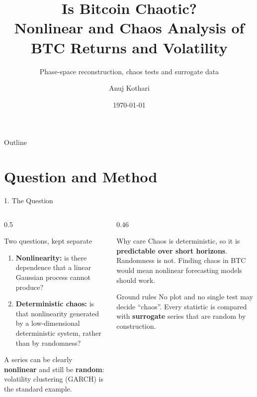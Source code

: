 \documentclass[aspectratio=169,10pt]{beamer}
\title[\textbf{Nonlinear Analysis of BTC}]{\Large \textbf{Is Bitcoin Chaotic?}\\\large Nonlinear and Chaos Analysis of BTC Returns and Volatility}
\subtitle{Phase-space reconstruction, chaos tests and surrogate data}
\author[\textbf{Anuj Kothari}]{Anuj Kothari}
\date{\today}
\begin{document}
\begin{frame}
    \titlepage
\end{frame}

\begin{frame}{Outline}
    \tableofcontents
\end{frame}

\section{Question and Method}

\begin{frame}{1. The Question}
    \begin{columns}[T]
        \begin{column}{0.5\textwidth}
            \begin{block}{Two questions, kept separate}
                \small
                \begin{enumerate}
                    \item \textbf{Nonlinearity:} is there dependence that a linear Gaussian process cannot produce?
                    \item \textbf{Deterministic chaos:} is that nonlinearity generated by a low-dimensional deterministic system, rather than by randomness?
                \end{enumerate}
            \end{block}
            \small
            A series can be clearly \textbf{nonlinear} and still be \textbf{random}: volatility clustering (GARCH) is the standard example.
        \end{column}
        \begin{column}{0.46\textwidth}
            \begin{alertblock}{Why care}
                \small
                Chaos is deterministic, so it is \textbf{predictable over short horizons}. Randomness is not.
                Finding chaos in BTC would mean nonlinear forecasting models should work.
            \end{alertblock}
            \begin{block}{Ground rules}
                \small
                No plot and no single test may decide ``chaos''. Every statistic is compared with \textbf{surrogate} series that are random by construction.
            \end{block}
        \end{column}
    \end{columns}
\end{frame}
\end{document}

